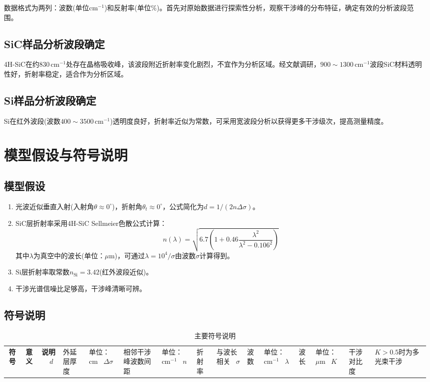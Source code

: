 \documentclass[12pt,a4paper]{article}
\begin{document}
数据格式为两列：波数(单位cm$^{-1}$)和反射率(单位$\%$)。首先对原始数据进行探索性分析，观察干涉峰的分布特征，确定有效的分析波段范围。

\subsection{SiC样品分析波段确定}
4H-SiC在约$830\,\text{cm}^{-1}$处存在晶格吸收峰，该波段附近折射率变化剧烈，不宜作为分析区域。经文献调研，$900\sim1300\,\text{cm}^{-1}$波段SiC材料透明性好，折射率稳定，适合作为分析区域。

\subsection{Si样品分析波段确定}
Si在红外波段(波数$400\sim3500\,\text{cm}^{-1}$)透明度良好，折射率近似为常数，可采用宽波段分析以获得更多干涉级次，提高测量精度。

\section{模型假设与符号说明}

\subsection{模型假设}
\begin{enumerate}
\item 光波近似垂直入射(入射角$\theta \approx 0^{\circ}$)，折射角$\theta_t \approx 0^{\circ}$，公式简化为$d = 1/(2n\Delta\sigma)$。
\item SiC层折射率采用4H-SiC Sellmeier色散公式计算：
\begin{equation}
n(\lambda) = \sqrt{6.7\left(1+0.46\frac{\lambda^2}{\lambda^2-0.106^2}\right)}
\end{equation}
其中$\lambda$为真空中的波长(单位：$\mu\text{m}$)，可通过$\lambda = 10^4/\sigma$由波数$\sigma$计算得到。
\item Si层折射率取常数$n_{\text{Si}} = 3.42$(红外波段近似)。
\item 干涉光谱信噪比足够高，干涉峰清晰可辨。
\end{enumerate}

\subsection{符号说明}
\begin{table}[H]
\centering
\begin{tabular}{ccc}
\toprule
\textbf{符号} & \textbf{意义} & \textbf{说明} \
\midrule
$d$ & 外延层厚度 & 单位：cm \
$\Delta\sigma$ & 相邻干涉峰波数间距 & 单位：cm$^{-1}$ \
$n$ & 折射率 & 与波长相关 \
$\sigma$ & 波数 & 单位：cm$^{-1}$ \
$\lambda$ & 波长 & 单位：$\mu\text{m}$ \
$K$ & 干涉对比度 & $K>0.5$时为多光束干涉 \
\bottomrule
\end{tabular}
\caption{主要符号说明}
\end{table}
\end{document}
